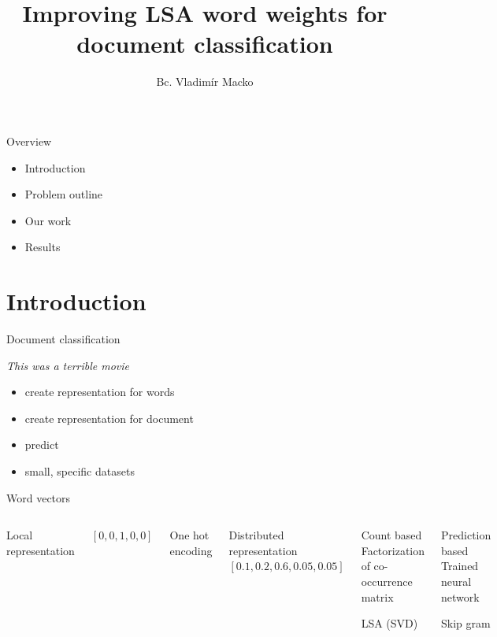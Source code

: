 \documentclass[xcolor={table}]{beamer}
\title{Improving LSA word weights for document classification}
\author{Bc. Vladimír Macko}
\institute{RNDr. Kristína Malinovská, PhD.}
\begin{document}
        
\begin{frame}
    \titlepage
\end{frame}
    
\begin{frame}{Overview}
    \begin{block}{}
        \begin{itemize}
            \item Introduction
            \item Problem outline
            \item Our work
            \item Results
        \end{itemize}
    \end{block}
\end{frame}

\section{Introduction}
\begin{frame}{Document classification}
    \begin{block}{}
        \emph{This was a terrible movie}
    \end{block}
    
    \begin{block}{}   
        \begin{itemize}
            \item create representation for words
            \item create representation for document
            \item predict
            \item small, specific datasets
        \end{itemize}
    \end{block}
\end{frame} 

\begin{frame}{Word vectors}
    \begin{columns}
        Local representation
        
        $[0,0,1,0,0]$
        \begin{block}{}
            One hot encoding
        \end{block}

        Distributed representation
        $[0.1,0.2,0.6,0.05,0.05]$
        \begin{block}{Count based}
            Factorization of co-occurrence matrix
            
            LSA (SVD)
        \end{block}
        \begin{block}{Prediction based}
            Trained neural network

            Skip gram    
        \end{block}    
   \end{columns}
\end{frame} 
\end{document}
